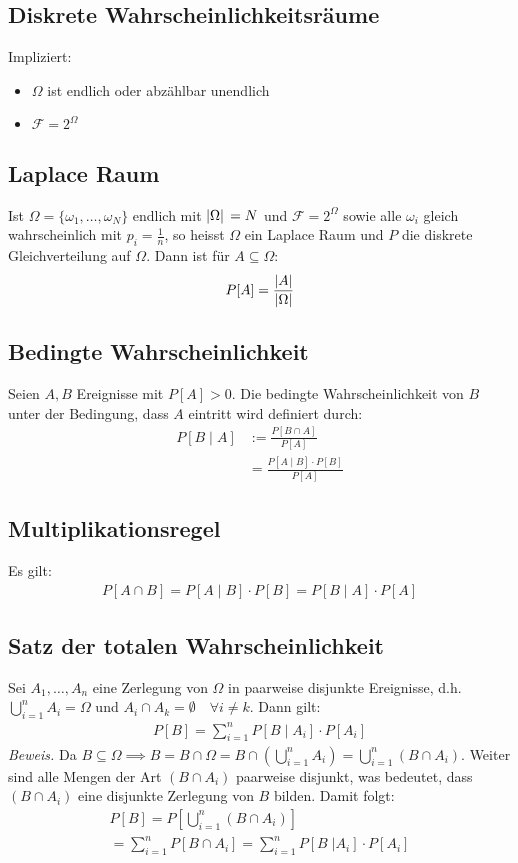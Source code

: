 \documentclass[8pt]{extarticle}
\newcommand{\F}{\mathcal{F}}
\newcommand{\Sn}{\sum_{i = 1}^n}
\begin{document}
\begin{multicols*}{3}
  \subsection*{Diskrete Wahrscheinlichkeitsräume}
  Impliziert:
  \begin{itemize}
    \item $\Omega$ ist endlich oder abzählbar unendlich
    \item $\F = 2^{\Omega}$
  \end{itemize}
  \subsection*{Laplace Raum}
  Ist $\Omega = \{\omega_1, \dots, \omega_N\}$ endlich mit $\abs*{\Omega} = N$
  und $\F = 2^\Omega$ sowie alle $\omega_i$ gleich wahrscheinlich mit $p_i =
    \frac{1}{n}$, so heisst $\Omega$ ein Laplace Raum und $P$ die diskrete
  Gleichverteilung auf $\Omega$. Dann ist für $A \subseteq \Omega$:
  \begin{align*}
    P[A] = \frac{\abs{A}}{\abs{\Omega}}
  \end{align*}
  \subsection*{Bedingte Wahrscheinlichkeit}
  Seien $A, B$ Ereignisse mit $P[A] > 0$. Die bedingte Wahrscheinlichkeit von $B$
  unter der Bedingung, dass $A$ eintritt wird definiert durch:
  \begin{align*}
    P[B \;|\; A] & := \frac{P[B \cap A]}{P[A]}            \\
                 & = \frac{P[A \;|\; B] \cdot P[B]}{P[A]}
  \end{align*}
  \subsection*{Multiplikationsregel}
  Es gilt:
  \begin{align*}
    P[A \cap B] = P[A \;|\; B] \cdot P[B] = P[B \;|\; A] \cdot P[A]
  \end{align*}
  \subsection*{Satz der totalen Wahrscheinlichkeit}
  Sei $A_1, \dots, A_n$ eine Zerlegung von $\Omega$ in paarweise disjunkte
  Ereignisse, d.h. $\bigcup_{i = 1}^n A_i = \Omega$ und $A_i \cap A_k = \emptyset
    \quad \forall i \neq k$. Dann gilt:
  \begin{align*}
    P[B] = \sum_{i = 1}^n P[B \; | \; A_i] \cdot P[A_i]
  \end{align*}
  \emph{Beweis.}
  Da $B \subseteq \Omega \implies B = B \cap \Omega
    = B \cap  (\bigcup_{i=1}^n A_i) = \bigcup_{i = 1}^n  (B \cap A_i)$.
  Weiter sind alle Mengen der Art $ (B \cap A_i)$ paarweise disjunkt,
  was bedeutet, dass $ (B \cap A_i)$ eine disjunkte Zerlegung von $B$
  bilden. Damit folgt:
  \begin{align*}
    P[B] = P \left[ \bigcup_{i = 1}^n  (B \cap A_i)\right] \\
    = \Sn P[B \cap A_i] = \sum_{i = 1}^n P[B \; | A_i] \cdot P[A_i]
  \end{align*}

\end{multicols*}
\end{document}
